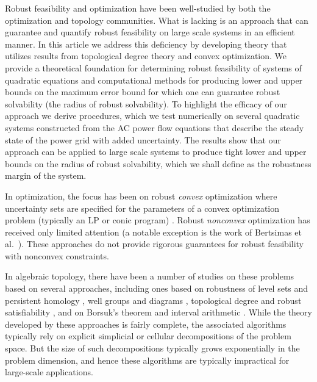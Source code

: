 Robust feasibility and optimization have been well-studied by both the optimization and topology communities. 
What is lacking is an approach that can guarantee and quantify robust feasibility on large scale systems in an efficient manner. 
In this article we address this deficiency by developing theory that utilizes results from topological degree theory and convex optimization. 
We provide a theoretical foundation for determining robust feasibility of systems of quadratic equations and computational methods for producing lower and upper bounds on the maximum error bound for which one can guarantee robust solvability (the radius of robust solvability). 
To highlight the efficacy of our approach we derive procedures, which we test numerically on several quadratic systems constructed from the AC power flow equations that describe the steady state of the power grid with added uncertainty. 
The results show that our approach can be applied to large scale systems to produce tight lower and upper bounds on the radius of robust solvability, which we shall define as the robustness margin of the system.

In optimization, the focus has been on robust \emph{convex} optimization where uncertainty sets are specified for the parameters of a convex optimization problem (typically an LP or conic program) \cite{ben2009robust}.
Robust \emph{nonconvex} optimization has received only limited attention (a notable exception is the work of Bertsimas et al.~\cite{BeNoTe2010}).
These approaches do not provide rigorous guarantees for robust feasibility with nonconvex constraints.

In algebraic topology, there have been a number of studies on these problems based on several approaches, including ones based on robustness of level sets and persistent homology \cite{BeEdMoPa2010,EdMoPa2011}, well groups and diagrams \cite{ChSkPa2012,FrKr2016well,FrKr2016pers}, topological degree and robust satisfiability \cite{FrKr2015,FrKrWa2016},  and on Borsuk's theorem and interval arithmetic \cite{FrRa2015,FrHoLa2007,FrLa2005}.
While the theory developed by these approaches is fairly complete, the associated algorithms typically rely on explicit simplicial or cellular decompositions of the problem space.
But the size of such decompositions typically grows exponentially in the problem dimension, and hence these algorithms are typically impractical for large-scale applications.

